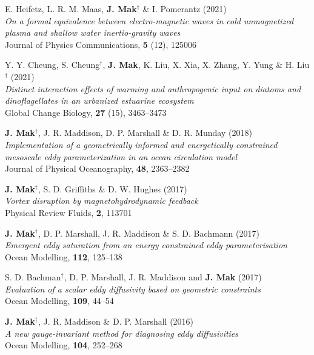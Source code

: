 \documentclass[letterpaper]{article}
\renewenvironment{itemize}{
  \begin{list}{}{
    \setlength{\leftmargin}{1.5em}
  }
}{
  \end{list}
}
\begin{document}
\begin{itemize}
\item[11.] E. Heifetz, L. R. M. Maas, \textbf{J. Mak}$^{\dagger}$ \& I. Pomerantz (2021)\\
\textit{On a formal equivalence between electro-magnetic waves in cold unmagnetized plasma and shallow water inertio-gravity waves}\\
Journal of Physics Communications, \textbf{5} (12), 125006

\item[10.] Y. Y. Cheung, S. Cheung$^{\dagger}$, \textbf{J. Mak}, K. Liu, X. Xia, X. Zhang, Y. Yung \& H. Liu$^{\dagger}$ (2021)\\
\textit{Distinct interaction effects of warming and anthropogenic input on
diatoms and dinoflagellates in an urbanized estuarine ecosystem}\\
Global Change Biology, \textbf{27} (15), 3463--3473

\item[9.] \textbf{J. Mak}$^{\dagger}$, J. R. Maddison, D. P. Marshall \& D. R. Munday
(2018)\\
\textit{Implementation of a geometrically informed and energetically constrained
mesoscale eddy parameterization in an ocean circulation model}\\
Journal of Physical Oceanography, \textbf{48}, 2363--2382

\item[8.] \textbf{J. Mak}$^{\dagger}$, S. D. Griffiths \& D. W. Hughes
(2017)\\
\textit{Vortex disruption by magnetohydrodynamic feedback}\\
Physical Review Fluids, \textbf{2}, 113701

\item[7.] \textbf{J. Mak}$^{\dagger}$, D. P. Marshall, J. R. Maddison \& S. D. Bachmann
(2017)\\
\textit{Emergent eddy saturation from an energy constrained eddy parameterisation}\\
Ocean Modelling, \textbf{112}, 125--138

\item[6.] S. D. Bachman$^{\dagger}$, D. P. Marshall, J. R. Maddison and \textbf{J. Mak}
(2017)\\
\textit{Evaluation of a scalar eddy diffusivity based on geometric constraints}\\
Ocean Modelling, \textbf{109}, 44--54

\item[5.] \textbf{J. Mak}$^{\dagger}$, J. R. Maddison \& D. P. Marshall
(2016)\\
\textit{A new gauge-invariant method for diagnosing eddy diffusivities}\\
Ocean Modelling, \textbf{104}, 252--268


\end{itemize}
\end{document}
